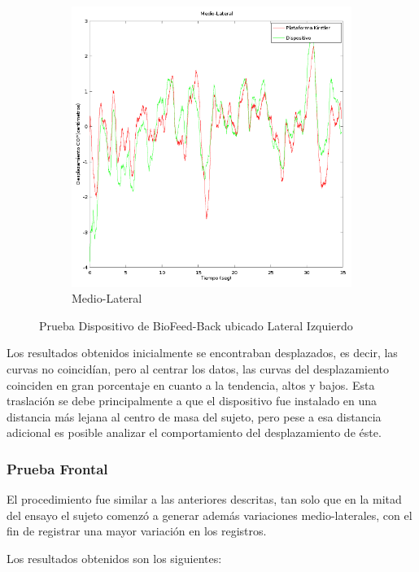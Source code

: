 \documentclass[12pt,a4paper]{article}
\newcommand{\nombreDispositivo}{Dispositivo de BioFeed-Back }
\begin{document}
\begin{figure}[H]
\begin{subfigure}{.5\textwidth}
			\includegraphics[width=1\linewidth]{images/pruebas/LateralIzquierdo/Medio-Lateral}
			\caption{Medio-Lateral}
			\label{fig:medioLateralIzquierdo}
		\end{subfigure}
		\caption{Prueba \nombreDispositivo ubicado Lateral Izquierdo}
		\label{fig:pruebaLateralIzquierdo}
	\end{figure}
	
	Los resultados obtenidos inicialmente se encontraban desplazados, es decir, las curvas no coincidían, pero al centrar los datos, las curvas del desplazamiento coinciden en gran porcentaje en cuanto a la tendencia, altos y bajos.
	Esta traslación se debe principalmente a que el dispositivo fue instalado en una distancia más lejana al centro de masa del sujeto, pero pese a esa distancia adicional es posible analizar el comportamiento del desplazamiento de éste.
	
\newpage
\subsubsection{Prueba Frontal}
El procedimiento fue similar a las anteriores descritas, tan solo que en la mitad del ensayo el sujeto comenzó a generar además variaciones medio-laterales, con el fin de registrar una mayor variación en los registros.

Los resultados obtenidos son los siguientes:
	
\end{document}
